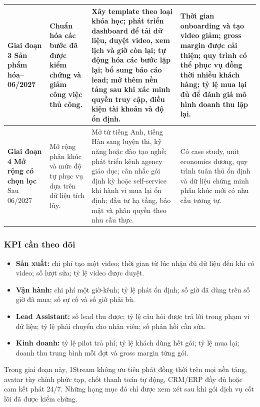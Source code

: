 \begin{center}
\begin{longtable}{|>{\raggedright\arraybackslash}p{2.3cm}|
    >{\raggedright\arraybackslash}p{3.7cm}|
    >{\raggedright\arraybackslash}p{4.4cm}|
    >{\raggedright\arraybackslash}p{4.2cm}|}
    \textbf{Giai đoạn 3}\newline
    \textbf{Sản phẩm hóa}\newline
    01--06/2027 &
    Chuẩn hóa các bước đã được kiểm chứng và giảm công việc thủ công. &
    Xây template theo loại khóa học; phát triển dashboard để tải dữ liệu, duyệt
    video, xem lịch và giờ còn lại; tự động hóa các bước lặp lại; bổ sung báo cáo
    lead; mở thêm nền tảng sau khi xác minh quyền truy cập, điều kiện tài khoản
    và độ ổn định. &
    Thời gian onboarding và tạo video giảm; gross margin được cải thiện; quy
    trình có thể phục vụ đồng thời nhiều khách hàng; tỷ lệ mua lại đủ để đánh
    giá mô hình doanh thu lặp lại. \\ \hline

    \textbf{Giai đoạn 4}\newline
    \textbf{Mở rộng có chọn lọc}\newline
    Sau 06/2027 &
    Mở rộng phân khúc và mức độ tự phục vụ dựa trên dữ liệu tích lũy. &
    Mở từ tiếng Anh, tiếng Hàn sang luyện thi, kỹ năng hoặc đào tạo nghề; phát
    triển kênh agency giáo dục; cân nhắc gói định kỳ hoặc self-service khi hành
    vi mua lại ổn định; đầu tư hạ tầng, bảo mật và phân quyền theo nhu cầu thực. &
    Có case study, unit economics dương, quy trình tuân thủ ổn định và dữ liệu
    chứng minh phân khúc mới có nhu cầu tương tự. \\ \hline
\end{longtable}
\end{center}

\subsubsection*{KPI cần theo dõi}

\begin{itemize}
    \item \textbf{Sản xuất:} chi phí tạo một video; thời gian từ lúc nhận đủ dữ
    liệu đến khi có video; số lượt sửa; tỷ lệ video được duyệt.
    \item \textbf{Vận hành:} chi phí một giờ-kênh; tỷ lệ phát ổn định; số giờ đã
    dùng trên số giờ đã mua; số sự cố và số giờ phải bù.
    \item \textbf{Lead Assistant:} số lead thu được; tỷ lệ câu hỏi được trả lời
    trong phạm vi dữ liệu; tỷ lệ phải chuyển cho nhân viên; số phản hồi cần sửa.
    \item \textbf{Kinh doanh:} tỷ lệ pilot trả phí; tỷ lệ khách dùng hết gói;
    tỷ lệ mua lại; doanh thu trung bình mỗi đợt và gross margin từng gói.
\end{itemize}

Trong giai đoạn này, 1Stream không ưu tiên phát đồng thời trên mọi nền tảng,
avatar tùy chỉnh phức tạp, chốt thanh toán tự động, CRM/ERP đầy đủ hoặc cam kết
phát 24/7. Những hạng mục đó chỉ được xem xét sau khi gói dịch vụ cốt lõi đã được
kiểm chứng.

